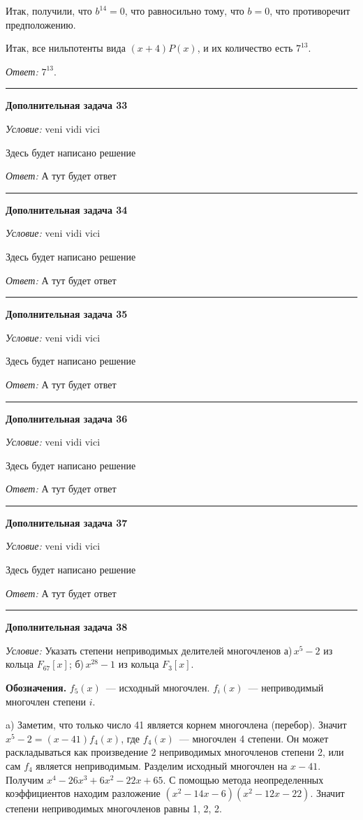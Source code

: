 \documentclass[12pt,a4paper]{article}
\newcommand{\sbs}{\large \bfseries}
\newcommand{\rl}{\vspace{16pt} \hrule \vspace{8pt}}
\begin{document}
Итак, получили, что $b^{14} = 0$, что равносильно тому, что $b = 0$, что противоречит предположению.

Итак, все нильпотенты вида $(x+4)P(x)$, и их количество есть $7^{13}$.

{\itshape Ответ:} $7^{13}$.




\rl
{\sbs Дополнительная задача 33}

{\itshape Условие: } veni vidi vici

Здесь будет написано решение

{\itshape Ответ: } А тут будет ответ




\rl
{\sbs Дополнительная задача 34}

{\itshape Условие: } veni vidi vici

Здесь будет написано решение

{\itshape Ответ: } А тут будет ответ




\rl
{\sbs Дополнительная задача 35}

{\itshape Условие: } veni vidi vici

Здесь будет написано решение

{\itshape Ответ: } А тут будет ответ




\rl
{\sbs Дополнительная задача 36}

{\itshape Условие: } veni vidi vici

Здесь будет написано решение

{\itshape Ответ: } А тут будет ответ




\rl
{\sbs Дополнительная задача 37}

{\itshape Условие: } veni vidi vici

Здесь будет написано решение

{\itshape Ответ: } А тут будет ответ




\rl
{\sbs Дополнительная задача 38}

{\itshape Условие: } Указать степени неприводимых делителей многочленов а)\,$x^5-2$ из кольца $F_{67}[x]$; б)\,$x^{28}-1$ из кольца $F_3[x]$.

\textbf{Обозначения. }$f_5(x)$~--- исходный многочлен. $f_i(x)$~--- неприводимый многочлен степени $i$.\null

a) Заметим, что только число 41 является корнем многочлена (перебор). Значит $x^5-2=(x-41)f_4(x)$, где $f_4(x)$~--- многочлен 4 степени. Он
может раскладываться как произведение 2 неприводимых многочленов степени 2, или сам $f_4$ является неприводимым. Разделим исходный многочлен на $x-41$. Получим $x^4-26x^3+6x^2-22x+65$. С помощью метода неопределенных коэффициентов находим разложение $(x^2-14x-6)(x^2-12x-22)$. Значит степени неприводимых многочленов равны 1, 2, 2.
\end{document}

